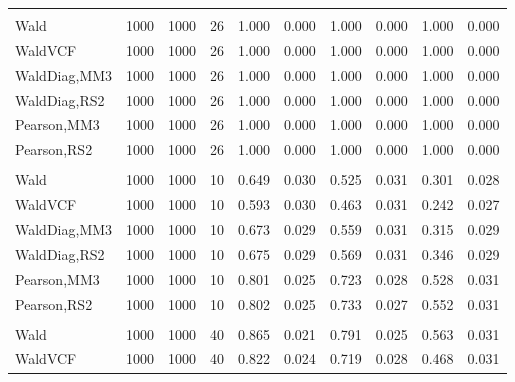 \documentclass[
]{article}
\begin{document}
\begin{table}[H]
{\begin{tabular}[t]{lrrrrrrlrr}
\addlinespace[0.3em]
\multicolumn{10}{l}{\textbf{1F 15V}}\\
\hspace{1em}Wald & 1000 & 1000 & 26 & 1.000 & 0.000 & 1.000 & 0.000 & 1.000 & 0.000\\
\hspace{1em}WaldVCF & 1000 & 1000 & 26 & 1.000 & 0.000 & 1.000 & 0.000 & 1.000 & 0.000\\
\hspace{1em}WaldDiag,MM3 & 1000 & 1000 & 26 & 1.000 & 0.000 & 1.000 & 0.000 & 1.000 & 0.000\\
\hspace{1em}WaldDiag,RS2 & 1000 & 1000 & 26 & 1.000 & 0.000 & 1.000 & 0.000 & 1.000 & 0.000\\
\hspace{1em}Pearson,MM3 & 1000 & 1000 & 26 & 1.000 & 0.000 & 1.000 & 0.000 & 1.000 & 0.000\\
\hspace{1em}Pearson,RS2 & 1000 & 1000 & 26 & 1.000 & 0.000 & 1.000 & 0.000 & 1.000 & 0.000\\
\addlinespace[0.3em]
\multicolumn{10}{l}{\textbf{2F 10V}}\\
\hspace{1em}Wald & 1000 & 1000 & 10 & 0.649 & 0.030 & 0.525 & 0.031 & 0.301 & 0.028\\
\hspace{1em}WaldVCF & 1000 & 1000 & 10 & 0.593 & 0.030 & 0.463 & 0.031 & 0.242 & 0.027\\
\hspace{1em}WaldDiag,MM3 & 1000 & 1000 & 10 & 0.673 & 0.029 & 0.559 & 0.031 & 0.315 & 0.029\\
\hspace{1em}WaldDiag,RS2 & 1000 & 1000 & 10 & 0.675 & 0.029 & 0.569 & 0.031 & 0.346 & 0.029\\
\hspace{1em}Pearson,MM3 & 1000 & 1000 & 10 & 0.801 & 0.025 & 0.723 & 0.028 & 0.528 & 0.031\\
\hspace{1em}Pearson,RS2 & 1000 & 1000 & 10 & 0.802 & 0.025 & 0.733 & 0.027 & 0.552 & 0.031\\
\addlinespace[0.3em]
\multicolumn{10}{l}{\textbf{3F 15V}}\\
\hspace{1em}Wald & 1000 & 1000 & 40 & 0.865 & 0.021 & 0.791 & 0.025 & 0.563 & 0.031\\
\hspace{1em}WaldVCF & 1000 & 1000 & 40 & 0.822 & 0.024 & 0.719 & 0.028 & 0.468 & 0.031\\

\end{tabular}}
\end{table}
\end{document}
